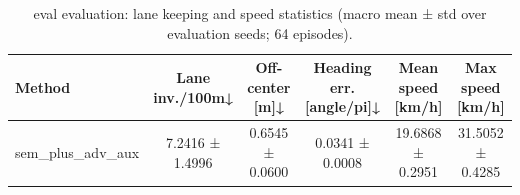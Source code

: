 \begin{table}
\caption{eval evaluation: lane keeping and speed statistics (macro mean ± std over evaluation seeds; 64 episodes).}
\label{tab:eval_lane_speed}
\begin{tabular}{lccccc}
\toprule
Method & Lane inv./100m↓ & Off-center [m]↓ & Heading err. [angle/pi]↓ & Mean speed [km/h] & Max speed [km/h] \\
\midrule
sem_plus_adv_aux & 7.2416 ± 1.4996 & 0.6545 ± 0.0600 & 0.0341 ± 0.0008 & 19.6868 ± 0.2951 & 31.5052 ± 0.4285 \\
\bottomrule
\end{tabular}
\end{table}
